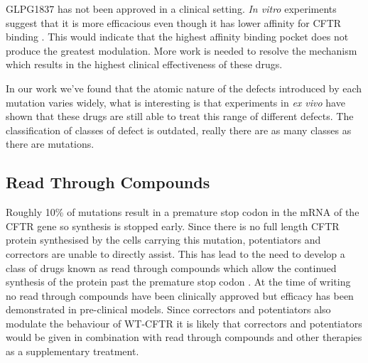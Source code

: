 GLPG1837 has not been approved in a clinical setting. \textit {In vitro} experiments suggest that it is more efficacious even though it has lower affinity for CFTR binding \cite{vanderplas2018}. This would indicate that the highest affinity binding pocket does not produce the greatest modulation. More work is needed to resolve the mechanism which results in the highest clinical effectiveness of these drugs.  

In our work we've found that the atomic nature of the defects introduced by each mutation varies widely, what is interesting is that experiments in \textit{ex vivo} have shown that these drugs are still able to treat this range of different defects. The classification of classes of defect is outdated, really there are as many classes as there are mutations.

\subsection{Read Through Compounds}
Roughly 10\% of mutations result in a premature stop codon in the mRNA of the CFTR gene so synthesis is stopped early. Since there is no full length CFTR protein synthesised by the cells carrying this mutation, potentiators and correctors are unable to directly assist. This has lead to the need to develop a class of drugs known as read through compounds which allow the continued synthesis of the protein past the premature stop codon \cite{sharma2021}. At the time of writing no read through compounds have been clinically approved but efficacy has been demonstrated in pre-clinical models\cite{crawford2021}. Since correctors and potentiators also modulate the behaviour of WT-CFTR it is likely that correctors and potentiators would be given in combination with read through compounds and other therapies as a supplementary treatment.

